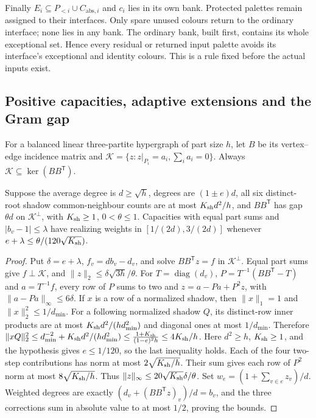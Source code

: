 Finally $E_i\subseteq{}P_{<i}\cup{}C_{\mathrm{abs},i}$ and $c_i$ lies in its own bank.  Protected palettes remain assigned to their
interfaces.  Only spare unused colours return to the ordinary
interface; none lies in any bank.  The ordinary bank, built first,
contains its whole exceptional set.  Hence every residual or returned
input palette avoids its interface's exceptional and identity colours.
This is a rule fixed before the actual inputs exist.

\subsection{Positive capacities, adaptive extensions and the Gram gap}
\label{sec:fractional}\label{sec:sample}\label{sg:sec:gram}
\label{sg:lem:fractionalinput}

For a balanced linear three-partite hypergraph of part size $h$, let $B$ be its vertex--edge incidence matrix and $\mathcal{K}=\{z:z|_{P_i}=a_i,\sum_ia_i=0\}$. Always $\mathcal{K}\subseteq\ker(BB^{\mathsf{T}})$.

\begin{lemma}\label{lem:capacities}
Suppose the average degree is $d\ge\sqrt{h}$, degrees are $(1\pm{}e)d$, all six distinct-root shadow common-neighbour counts are at most $K_{\rm{}sh}d^2/h$, and $BB^{\mathsf{T}}$ has gap $\theta{}d$ on $\mathcal{K}^\perp$, with $K_{\rm{}sh}\ge1$, $0<\theta\le1$.  Capacities with equal part sums and $|b_v-1|\le\lambda$ have realizing weights in $[1/(2d),3/(2d)]$ whenever $e+\lambda\le\theta/(120\sqrt{K_{\rm{}sh}})$.
\end{lemma}
\begin{proof}
Put $\delta=e+\lambda$, $f_v=db_v-d_v$, and solve $BB^{\mathsf{T}}z=f$ in $\mathcal{K}^\perp$.  Equal part sums give $f\perp\mathcal{K}$, and $\|z\|_2\le\delta\sqrt{3h}/\theta$. For $T=\operatorname{diag}(d_v)$, $P=T^{-1}(BB^{\mathsf{T}}-T)$ and $a=T^{-1}f$, every row of $P$ sums to two and $z=a-Pa+P^2z$, with $\|a-Pa\|_\infty\le6\delta$. If $x$ is a row of a normalized shadow, then $\|x\|_1=1$ and $\|x\|_2^2\le1/d_{\min}$.  For a following normalized shadow $Q$, its distinct-row inner products are at most $K_{\rm{}sh}d^2/(hd_{\min}^2)$ and diagonal ones at most $1/d_{\min}$.  Therefore $\|xQ\|_2^2\le{}d_{\min}^{-2}+K_{\rm{}sh}d^2/(hd_{\min}^2)\le\frac{1+K_{\rm{}sh}}{(1-e)^2h}\le4K_{\rm{}sh}/h$. Here $d^2\ge{}h$, $K_{\rm{}sh}\ge1$, and the hypothesis gives $e\le1/120$, so the last inequality holds. Each of the four two-step contributions has norm at most $2\sqrt{K_{\rm{}sh}/h}$. Their sum gives each row of $P^2$ norm at most $8\sqrt{K_{\rm{}sh}/h}$.  Thus $\|z\|_\infty\le20\sqrt{K_{\rm{}sh}}\delta/\theta$. Set $w_e=(1+\sum_{v\in{}e}z_v)/d$.  Weighted degrees are exactly $(d_v+(BB^{\mathsf{T}}z)_v)/d=b_v$, and the three corrections sum in absolute value to at most $1/2$, proving the bounds.
\end{proof}

